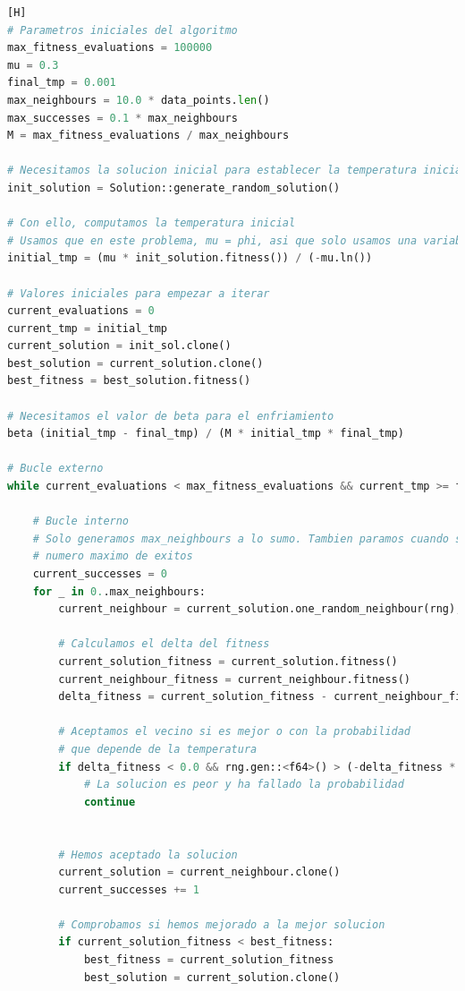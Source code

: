 \documentclass[11pt]{article}
\begin{document}
\begin{lstlisting}[language=Python, style=Boxed][H]
# Parametros iniciales del algoritmo
max_fitness_evaluations = 100000
mu = 0.3
final_tmp = 0.001
max_neighbours = 10.0 * data_points.len()
max_successes = 0.1 * max_neighbours
M = max_fitness_evaluations / max_neighbours

# Necesitamos la solucion inicial para establecer la temperatura inicial
init_solution = Solution::generate_random_solution()

# Con ello, computamos la temperatura inicial
# Usamos que en este problema, mu = phi, asi que solo usamos una variable
initial_tmp = (mu * init_solution.fitness()) / (-mu.ln())

# Valores iniciales para empezar a iterar
current_evaluations = 0
current_tmp = initial_tmp
current_solution = init_sol.clone()
best_solution = current_solution.clone()
best_fitness = best_solution.fitness()

# Necesitamos el valor de beta para el enfriamiento
beta (initial_tmp - final_tmp) / (M * initial_tmp * final_tmp)

# Bucle externo
while current_evaluations < max_fitness_evaluations && current_tmp >= final_tmp:

    # Bucle interno
    # Solo generamos max_neighbours a lo sumo. Tambien paramos cuando se ha alcanzado un
    # numero maximo de exitos
    current_successes = 0
    for _ in 0..max_neighbours:
        current_neighbour = current_solution.one_random_neighbour(rng);

        # Calculamos el delta del fitness
        current_solution_fitness = current_solution.fitness()
        current_neighbour_fitness = current_neighbour.fitness()
        delta_fitness = current_solution_fitness - current_neighbour_fitness

        # Aceptamos el vecino si es mejor o con la probabilidad
        # que depende de la temperatura
        if delta_fitness < 0.0 && rng.gen::<f64>() > (-delta_fitness * current_tmp):
            # La solucion es peor y ha fallado la probabilidad
            continue


        # Hemos aceptado la solucion
        current_solution = current_neighbour.clone()
        current_successes += 1

        # Comprobamos si hemos mejorado a la mejor solucion
        if current_solution_fitness < best_fitness:
            best_fitness = current_solution_fitness
            best_solution = current_solution.clone()



\end{lstlisting}
\end{document}
